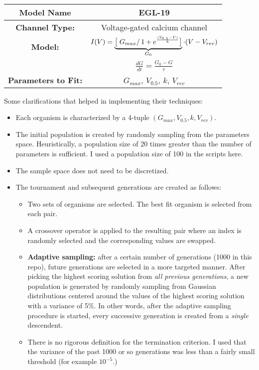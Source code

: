 \documentclass[11pt]{article}
\newcommand{\channeltype}{\textbf{Channel Type:}}
\newcommand{\model}{\textbf{Model:}}
\newcommand{\parameters}{\textbf{Parameters to Fit:}}
\begin{document}
{\renewcommand{\arraystretch}{2}%
\begin{tabular}{| c | c |}
\hline
\textbf{Model Name} & EGL-19 \\ \hline
\channeltype & Voltage-gated calcium channel \\ \hline
\model & $I(V) = \underbrace{\big[\left.G_{max} \right/ 1 + e^{\frac{(V_{0.5} - V)}{k}}\big]}_{G_{0}} \cdot (V - V_{rev})$ \\
& $\frac{dG}{dt} = \frac{G_{0} - G}{\tau}$ \\ \hline
\parameters & $G_{max}$, $V_{0.5}$, $k$, $V_{rev}$ \\
\hline
\end{tabular}

Some clarifications that helped in implementing their techniques: 
\begin{itemize}
\item Each organism is characterized by a 4-tuple $(G_{max}, V_{0.5}, k, V_{rev})$. 
\item The initial population is created by randomly sampling from the parameters space.  Heuristically, 
a population size of 20 times greater than the number of parameters is sufficient.  I used a population size of 100
in the scripts here. 
\item The sample space does not need to be discretized.  
\item The tournament and subsequent generations are created as follows:
\begin{itemize}
\item Two sets of organisms are selected.  The best fit organism is selected from each pair.
\item A crossover operator is applied to the resulting pair where an index is randomly selected
and the corresponding values are swapped. 
\item \textbf{Adaptive sampling:} after a certain number of generations (1000 in this repo), future generations 
are selected in a more targeted manner.  After picking the highest scoring solution from \emph{all previous generations},
a new population is generated by randomly sampling from Gaussian distributions centered around the values of the
highest scoring solution with a variance of 5\%.  In other words, after the adaptive sampling procedure is started,
every successive generation is created from a \emph{single} descendent.  
\item There is no rigorous definition for the termination criterion.  I used that the variance of the past 1000 or so generations
was less than a fairly small threshold (for example $10^{-5}$.)

\end{itemize}
\end{itemize}}
\end{document}

